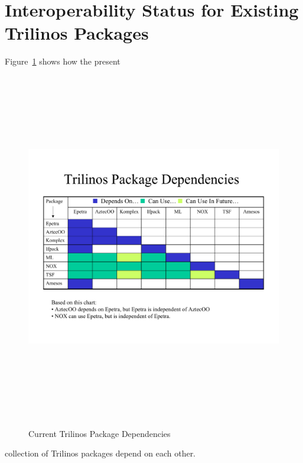 \documentclass[12pt,relax]{TrilinosDevGuide}
\begin{document}
\section{Interoperability Status for Existing Trilinos Packages}
Figure~\ref{Figure:TrilinosPackageDependencies} shows how the present
\begin{figure}
\includegraphics[height=6in,angle=270]{TrilinosPackageDependencies}
\label{Figure:TrilinosPackageDependencies}
\caption{Current Trilinos Package Dependencies}
\end{figure}
collection of Trilinos packages depend on each other.


\clearpage



\appendix
\end{document}
